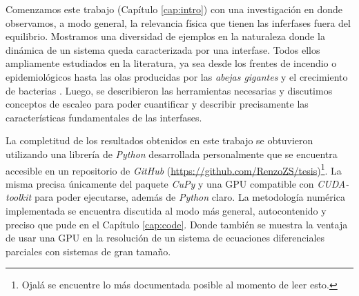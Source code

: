 \graphicspath{{figs/cap6}}


Comenzamos este trabajo (Capítulo \ref{cap:intro}) con una investigación en donde observamos, a modo general, la relevancia física que tienen las inferfases fuera del equilibrio. Mostramos una diversidad de ejemplos en la naturaleza donde la dinámica de un sistema queda caracterizada por una interfase. Todos ellos ampliamente estudiados en la literatura, ya sea desde los frentes de incendio o epidemiológicos hasta las olas producidas por las \textit{abejas gigantes} y el crecimiento de bacterias \cite{zhang1992modeling, provatas1995scaling, PhysRevLett.79.1515, Jullien1992SurfaceD, PhysRevLett.110.035501, kastberger2014speeding, kastberger2013social, kastberger2008social, matsushita1990diffusion, bhattacharjee2022chemotactic, mate_sist_bio, barbieri2020soil, stenseth2008plague}. Luego, se describieron las herramientas necesarias y discutimos conceptos de escaleo para poder cuantificar y describir precisamente las características fundamentales de las interfases.





La completitud de los resultados obtenidos en este trabajo se obtuvieron utilizando una librería de \textit{Python} desarrollada personalmente que se encuentra accesible en un repositorio de \textit{GitHub} (\href{https://github.com/RenzoZS/tesis}{https://github.com/RenzoZS/tesis})\footnote{Ojalá se encuentre lo más documentada posible al momento de leer esto.}. La misma precisa únicamente del paquete \textit{CuPy} y una GPU compatible con \textit{CUDA-toolkit} para poder ejecutarse, además de \textit{Python} claro. La metodología numérica implementada se encuentra discutida al modo más general, autocontenido y preciso que pude en el Capítulo \ref{cap:code}. Donde también se muestra la ventaja de usar una GPU en la resolución de un sistema de ecuaciones diferenciales parciales con sistemas de gran tamaño.




